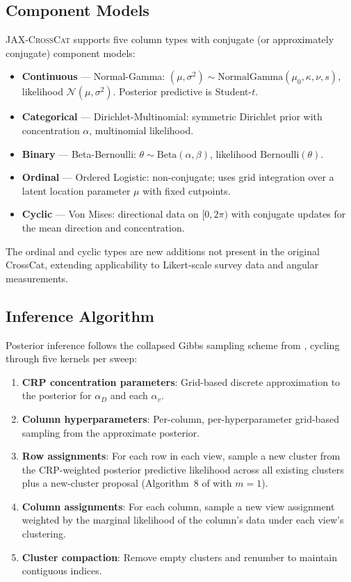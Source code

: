 \documentclass[11pt]{article}
\newcommand{\jaxcc}{\textsc{JAX-CrossCat}}
\begin{document}
\subsection{Component Models}

\jaxcc{} supports five column types with conjugate (or approximately
conjugate) component models:

\begin{itemize}
  \item \textbf{Continuous} --- Normal-Gamma: $(\mu, \sigma^2) \sim
    \mathrm{NormalGamma}(\mu_0, \kappa, \nu, s)$, likelihood
    $\mathcal{N}(\mu, \sigma^2)$. Posterior predictive is Student-$t$.
  \item \textbf{Categorical} --- Dirichlet-Multinomial: symmetric
    Dirichlet prior with concentration $\alpha$, multinomial likelihood.
  \item \textbf{Binary} --- Beta-Bernoulli: $\theta \sim
    \mathrm{Beta}(\alpha, \beta)$, likelihood $\mathrm{Bernoulli}(\theta)$.
  \item \textbf{Ordinal} --- Ordered Logistic: non-conjugate; uses grid
    integration over a latent location parameter $\mu$ with fixed
    cutpoints.
  \item \textbf{Cyclic} --- Von Mises: directional data on $[0, 2\pi)$
    with conjugate updates for the mean direction and concentration.
\end{itemize}

The ordinal and cyclic types are new additions not present in the
original CrossCat, extending applicability to Likert-scale survey data
and angular measurements.

\subsection{Inference Algorithm}

Posterior inference follows the collapsed Gibbs sampling scheme from
\citet{mansinghka2016crosscat}, cycling through five kernels per sweep:

\begin{enumerate}
  \item \textbf{CRP concentration parameters}: Grid-based discrete
    approximation to the posterior for $\alpha_D$ and each $\alpha_v$.
  \item \textbf{Column hyperparameters}: Per-column, per-hyperparameter
    grid-based sampling from the approximate posterior.
  \item \textbf{Row assignments}: For each row in each view, sample a
    new cluster from the CRP-weighted posterior predictive likelihood
    across all existing clusters plus a new-cluster proposal (Algorithm~8
    of \citet{neal2000markov} with $m=1$).
  \item \textbf{Column assignments}: For each column, sample a new view
    assignment weighted by the marginal likelihood of the column's data
    under each view's clustering.
  \item \textbf{Cluster compaction}: Remove empty clusters and renumber
    to maintain contiguous indices.
\end{enumerate}
\end{document}
